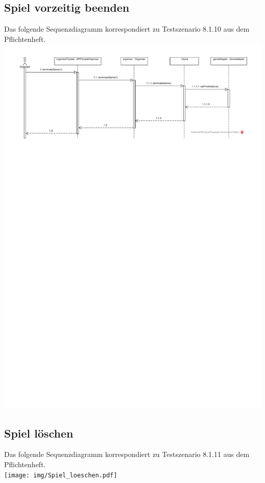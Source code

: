\documentclass[a4paper]{scrreprt}
\begin{document}
	\subsection{Spiel vorzeitig beenden}
	Das folgende Sequenzdiagramm korrespondiert zu Testszenario 8.1.10 aus dem Pflichtenheft. \\
	\includegraphics[width=\textwidth]{img/Vorzeitiges_Beenden.pdf}

	\subsection{Spiel löschen}
	Das folgende Sequenzdiagramm korrespondiert zu Testszenario 8.1.11 aus dem Pflichtenheft. \\
	\texttt{[image: img/Spiel\_loeschen.pdf]}
\end{document}
